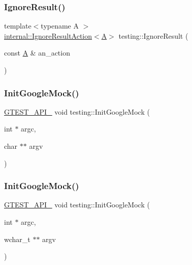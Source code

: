 \mbox{\label{namespacetesting_a50ae42540a31047c7fddd32df8d835f5}} 
\subsubsection{\texorpdfstring{Ignore\+Result()}{IgnoreResult()}}
{\footnotesize\ttfamily template$<$typename A $>$ \\
\hyperlink{classtesting_1_1internal_1_1_ignore_result_action}{internal\+::\+Ignore\+Result\+Action}$<$\hyperlink{namespacetesting_a5e9134d655d2fc9323902348083282e7}{A}$>$ testing\+::\+Ignore\+Result (\begin{DoxyParamCaption}\item[{const \hyperlink{namespacetesting_a5e9134d655d2fc9323902348083282e7}{A} \&}]{an\+\_\+action }\end{DoxyParamCaption})\hspace{0.3cm}{\ttfamily [inline]}}

\mbox{\label{namespacetesting_a32b1c6db9ba5133ccabfa67616b3c041}} 
\subsubsection{\texorpdfstring{Init\+Google\+Mock()}{InitGoogleMock()}\hspace{0.1cm}{\footnotesize\ttfamily [1/2]}}
{\footnotesize\ttfamily \hyperlink{gtest-port_8h_aa73be6f0ba4a7456180a94904ce17790}{G\+T\+E\+S\+T\+\_\+\+A\+P\+I\+\_\+} void testing\+::\+Init\+Google\+Mock (\begin{DoxyParamCaption}\item[{int $\ast$}]{argc,  }\item[{char $\ast$$\ast$}]{argv }\end{DoxyParamCaption})}

\mbox{\label{namespacetesting_a20fb86152763dddef67bc1dd8b090800}} 
\subsubsection{\texorpdfstring{Init\+Google\+Mock()}{InitGoogleMock()}\hspace{0.1cm}{\footnotesize\ttfamily [2/2]}}
{\footnotesize\ttfamily \hyperlink{gtest-port_8h_aa73be6f0ba4a7456180a94904ce17790}{G\+T\+E\+S\+T\+\_\+\+A\+P\+I\+\_\+} void testing\+::\+Init\+Google\+Mock (\begin{DoxyParamCaption}\item[{int $\ast$}]{argc,  }\item[{wchar\+\_\+t $\ast$$\ast$}]{argv }\end{DoxyParamCaption})}

